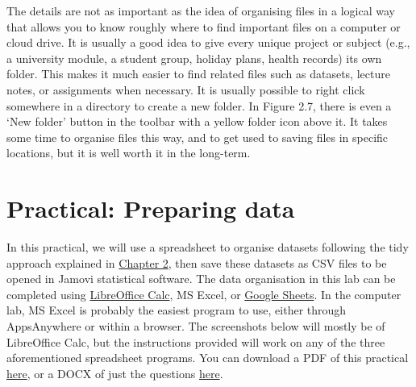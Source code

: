 \documentclass[
]{scrbook}
\begin{document}
The details are not as important as the idea of organising files in a logical way that allows you to know roughly where to find important files on a computer or cloud drive.
It is usually a good idea to give every unique project or subject (e.g., a university module, a student group, holiday plans, health records) its own folder.
This makes it much easier to find related files such as datasets, lecture notes, or assignments when necessary.
It is usually possible to right click somewhere in a directory to create a new folder.
In Figure 2.7, there is even a `New folder' button in the toolbar with a yellow folder icon above it.
It takes some time to organise files this way, and to get used to saving files in specific locations, but it is well worth it in the long-term.

\hypertarget{Chapter_3}{%
\chapter{Practical: Preparing data}\label{Chapter_3}}

In this practical, we will use a spreadsheet to organise datasets following the tidy approach explained in \protect\hyperlink{Chapter_2}{Chapter 2}, then save these datasets as CSV files to be opened in Jamovi statistical software.
The data organisation in this lab can be completed using \href{https://www.libreoffice.org/discover/calc/}{LibreOffice Calc}, MS Excel, or \href{https://docs.google.com/spreadsheets/}{Google Sheets}.
In the computer lab, MS Excel is probably the easiest program to use, either through AppsAnywhere or within a browser.
The screenshots below will mostly be of LibreOffice Calc, but the instructions provided will work on any of the three aforementioned spreadsheet programs.
You can download a PDF of this practical \href{https://bradduthie.github.io/SCIU4T4/chapters/chapter_3.pdf}{here}, or a DOCX of just the questions \href{https://bradduthie.github.io/SCIU4T4/practical_answers/Week1.docx}{here}.
\end{document}
